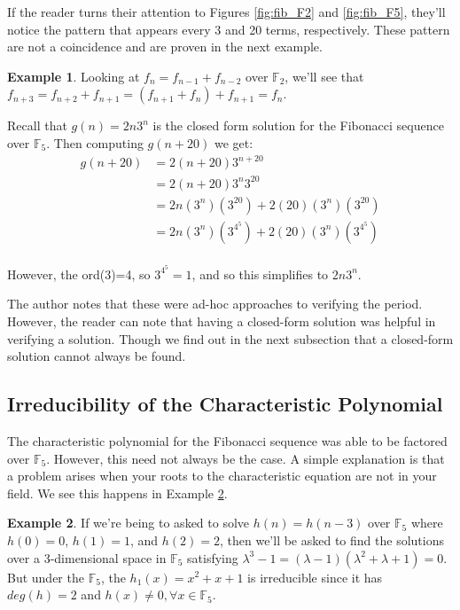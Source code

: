\documentclass[a4paper]{article}
\theoremstyle{definition}
\newtheorem{example}{Example}[section]
\begin{document}
If the reader turns their attention to Figures \ref{fig:fib_F2} and \ref{fig:fib_F5}, they'll notice the pattern that appears every 3 and 20 terms, respectively. These pattern are not a coincidence and are proven in the next example.
\\
\begin{example}
Looking at $f_n=f_{n-1}+f_{n-2}$ over $\mathbb{F}_2$, we'll see that $f_{n+3}=f_{n+2}+f_{n+1}=(f_{n+1}+f_{n})+f_{n+1}=f_{n}$.

Recall that $g(n)=2n3^n$ is the closed form solution for the Fibonacci sequence over $\mathbb{F}_5$. Then computing $g(n+20)$ we get:
\begin{align*}
g(n+20)
&=2(n+20)3^{n+20} \\
&=2(n+20)3^n3^{20} \\
&=2n(3^n)(3^{20})+2(20)(3^n)(3^{20}) \\
&=2n(3^n)(3^{4^{5}})+2(20)(3^n)(3^{4^{5}}) \\
\end{align*}

However, the ord($3$)=4, so $3^{4^{5}}=1$, and so this simplifies to $2n3^n$. 
\label{ex:period_fib_F5}
\end{example}

The author notes that these were ad-hoc approaches to verifying the period. However, the reader can note that having a closed-form solution was helpful in verifying a solution. Though we find out in the next subsection that a closed-form solution cannot always be found.

\subsection{Irreducibility of the Characteristic Polynomial}

The characteristic polynomial for the Fibonacci sequence was able to be factored over $\mathbb{F}_5$. However, this need not always be the case. A simple explanation is that a problem arises when your roots to the characteristic equation are not in your field. We see this happens in Example \ref{ex:cubic-irred}.
\\
\begin{example}
If we're being to asked to solve $h(n)=h(n-3)$ over $\mathbb{F}_5$ where $h(0)=0$, $h(1)=1$, and $h(2)=2$, then we'll be asked to find the solutions over a 3-dimensional space in $\mathbb{F}_5$ satisfying $\lambda^{3}-1=(\lambda-1)(\lambda^2+\lambda+1)=0$. But under the $\mathbb{F}_5$, the $h_1(x)=x^2+x+1$ is irreducible since it has $deg(h)=2$ and $h(x)\ne 0, \forall x\in \mathbb{F}_5$. 
\label{ex:cubic-irred}
\end{example}
\end{document}
